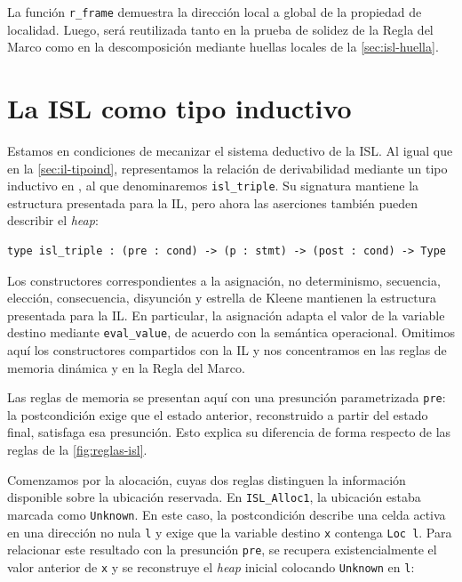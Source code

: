 \documentclass[a4paper,	11pt]{report}
\begin{document}
La función \lstinline|r_frame| demuestra la dirección local a global de la propiedad de localidad.
Luego,
será reutilizada tanto en la prueba de solidez de la Regla del Marco como en la descomposición mediante huellas locales de la \autoref{sec:isl-huella}.

\section{La ISL como tipo inductivo}
\label{sec:isl-tipoind}
Estamos en condiciones de mecanizar el sistema deductivo de la ISL.
Al igual que en la \autoref{sec:il-tipoind},
representamos la relación de derivabilidad mediante un tipo inductivo en \fstar{},
al que denominaremos \lstinline|isl_triple|.
Su signatura mantiene la estructura presentada para la IL,
pero ahora las aserciones también pueden describir el \emph{heap}:

\begin{lstlisting}
type isl_triple : (pre : cond) -> (p : stmt) -> (post : cond) -> Type
\end{lstlisting}

Los constructores correspondientes a la asignación,
no determinismo, secuencia, elección, consecuencia, disyunción y estrella de Kleene mantienen la estructura presentada para la IL.
En particular,
la asignación adapta el valor de la variable destino mediante \lstinline|eval_value|,
de acuerdo con la semántica operacional.
Omitimos aquí los constructores compartidos con la IL y nos concentramos en las reglas de memoria dinámica y en la Regla del Marco.

Las reglas de memoria se presentan aquí con una presunción parametrizada \lstinline|pre|:
la postcondición exige que el estado anterior,
reconstruido a partir del estado final,
satisfaga esa presunción.
Esto explica su diferencia de forma respecto de las reglas de la \autoref{fig:reglas-isl}.

Comenzamos por la alocación,
cuyas dos reglas distinguen la información disponible sobre la ubicación reservada.
En \lstinline|ISL_Alloc1|,
la ubicación estaba marcada como \lstinline|Unknown|.
En este caso,
la postcondición describe una celda activa en una dirección no nula \lstinline|l|
y exige que la variable destino \lstinline|x| contenga \lstinline|Loc l|.
Para relacionar este resultado con la presunción \lstinline|pre|,
se recupera existencialmente el valor anterior de \lstinline|x| y se reconstruye el \emph{heap} inicial colocando \lstinline|Unknown| en \lstinline|l|:
\end{document}
